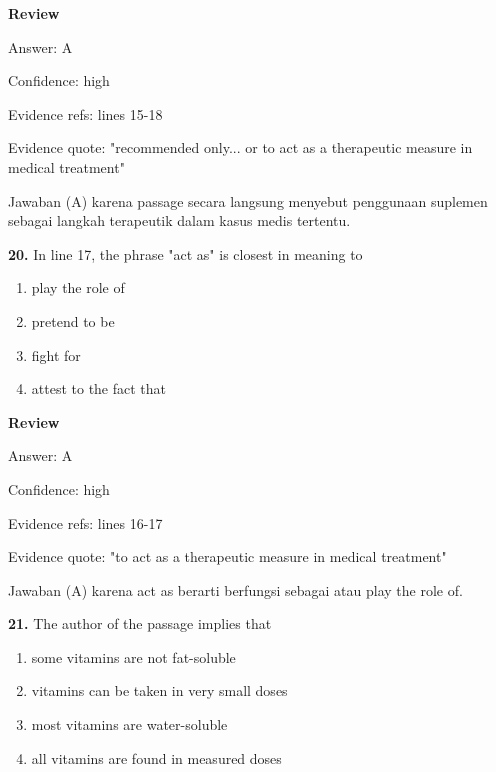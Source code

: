 \documentclass[12pt]{article}
\begin{document}
\par
\begingroup
\setlength{\parskip}{0pt}
\setlength{\parindent}{0pt}
\textbf{Review}\par
Answer: A\par
Confidence: high\par
Evidence refs: lines 15-18\par
Evidence quote: "recommended only... or to act as a therapeutic measure in medical treatment"\par
Jawaban (A) karena passage secara langsung menyebut penggunaan suplemen sebagai langkah terapeutik dalam kasus medis tertentu.\par
\endgroup
\par
\vspace{0.25\baselineskip}
\noindent\textbf{20.} In line 17, the phrase "act as" is closest in meaning to
\begin{enumerate}[label=(\Alph*),leftmargin=*,itemsep=0.2em]
\item play the role of
\item pretend to be
\item fight for
\item attest to the fact that
\end{enumerate}
\par
\begingroup
\setlength{\parskip}{0pt}
\setlength{\parindent}{0pt}
\textbf{Review}\par
Answer: A\par
Confidence: high\par
Evidence refs: lines 16-17\par
Evidence quote: "to act as a therapeutic measure in medical treatment"\par
Jawaban (A) karena act as berarti berfungsi sebagai atau play the role of.\par
\endgroup
\par
\vspace{0.25\baselineskip}
\noindent\textbf{21.} The author of the passage implies that
\begin{enumerate}[label=(\Alph*),leftmargin=*,itemsep=0.2em]
\item some vitamins are not fat-soluble
\item vitamins can be taken in very small doses
\item most vitamins are water-soluble
\item all vitamins are found in measured doses
\end{enumerate}
\par
\begingroup
\setlength{\parskip}{0pt}
\end{document}

